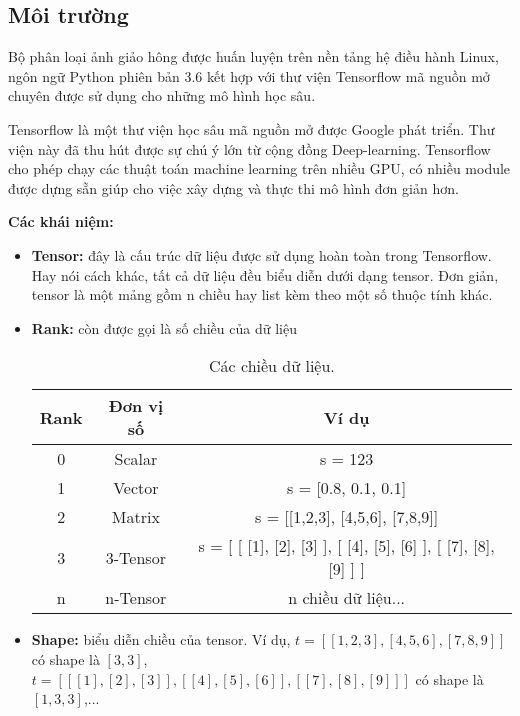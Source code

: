 \subsection{Môi trường}
	Bộ phân loại ảnh giảo hông được huấn luyện trên nền tảng hệ điều hành Linux, ngôn ngữ Python phiên bản 3.6 kết hợp với thư viện Tensorflow mã nguồn mở chuyên được sử dụng cho những mô hình học sâu.\par
	Tensorflow\cite{tf} là một thư viện học sâu mã nguồn mở được Google phát triển. Thư viện này đã thu hút được sự chú ý lớn từ cộng đồng Deep-learning. Tensorflow cho phép chạy các thuật toán machine learning trên nhiều GPU, có nhiều module được dựng sẵn giúp cho việc xây dựng và thực thi mô hình đơn giản hơn. \par
	\textbf{Các khái niệm:}
	\begin{itemize}
		\item \textbf{Tensor:} đây là cấu trúc dữ liệu được sử dụng hoàn toàn trong Tensorflow. Hay nói cách khác, tất cả dữ liệu đều biểu diễn dưới dạng tensor. Đơn giản, tensor là một mảng gồm n chiều hay list kèm theo một số thuộc tính khác.
		
		\item \textbf{Rank:} còn được gọi là số chiều của dữ liệu
		\begin{table}[h!]
			\centering
			\begin{tabular}{ | c | c | c | }
 			\hline
 			 \textbf{Rank} & \textbf{Đơn vị số} & \textbf{Ví dụ}\\
 			\hline
 			0  & Scalar  & s = 123  \\
			\hline
			1 & Vector & s = [0.8, 0.1, 0.1]	\\
			\hline
			2 & Matrix & s = [[1,2,3], [4,5,6], [7,8,9]]	\\
			\hline
			3 & 3-Tensor & s = [ [ [1], [2], [3] ], [ [4], [5], [6] ], [ [7], [8], [9] ] ]	\\
			\hline
			n & n-Tensor & n chiều dữ liệu... \\
			\hline
			
		\end{tabular}
		\caption{Các chiều dữ liệu.}
		\label{table:rank}
		\end{table}
		
		
		
		
		\item \textbf{Shape:} biểu diễn chiều của tensor. Ví dụ, \(t = [[1,2,3], [4,5,6], [7,8,9]]\) có shape là \([3, 3]\), \(t = [ [ [1], [2], [3] ], [ [4], [5], [6] ], [ [7], [8], [9] ] ]\) có shape là \([1, 3, 3]\),...
		

\end{itemize}
